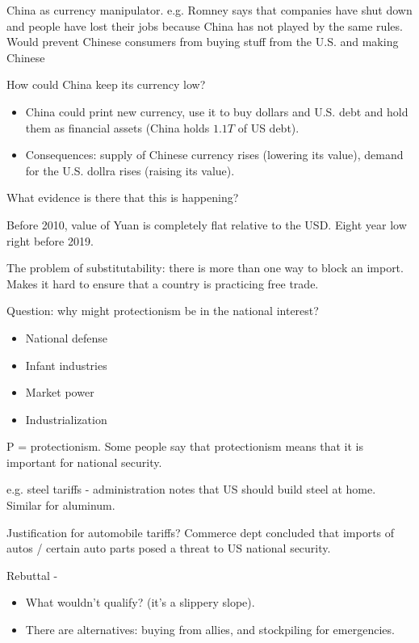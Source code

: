 \documentclass{article}
\begin{document}
China as currency manipulator.  e.g. Romney says that companies have shut down and people have lost their jobs because China has not played by the same rules.  Would prevent Chinese consumers from buying stuff from the U.S. and making Chinese 

How could China keep its currency low?

\begin{itemize}
  \item China could print new currency, use it to buy dollars and U.S. debt and hold them as financial assets (China holds $1.1T$ of US debt).
  \item Consequences: supply of Chinese currency rises (lowering its value), demand for the U.S. dollra rises (raising its value).
\end{itemize}

What evidence is there that this is happening?

Before 2010, value of Yuan is completely flat relative to the USD.  Eight year low right before 2019.

The problem of substitutability: there is more than one way to block an import.  Makes it hard to ensure that a country is practicing free trade.

Question: why might protectionism be in the national interest?

\begin{itemize}
  \item National defense
  \item Infant industries
  \item Market power
  \item Industrialization
\end{itemize}

P = protectionism.  Some people say that protectionism means that it is important for national security.

e.g. steel tariffs - administration notes that US should build steel at home.  Similar for aluminum.

Justification for automobile tariffs?  Commerce dept concluded that imports of autos / certain auto parts posed a threat to US national security.

Rebuttal -
\begin{itemize}
  \item What wouldn't qualify?  (it's a slippery slope).
  \item There are alternatives: buying from allies, and stockpiling for emergencies.
\end{itemize}
\end{document}
